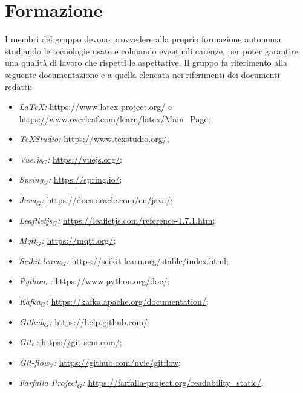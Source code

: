 \section{Formazione}\label{ProcessiOrganizzativiFormazione}
I membri del gruppo devono provvedere alla propria formazione autonoma studiando le tecnologie usate e colmando eventuali carenze, per poter garantire una qualità di lavoro che rispetti le aspettative. Il gruppo fa riferimento alla seguente documentazione e a quella elencata nei riferimenti dei documenti redatti:
\begin{itemize}
	\item \textit{\LaTeX:} \url{https://www.latex-project.org/} e \url{https://www.overleaf.com/learn/latex/Main_Page};
	\item \textit{\TeX Studio:} \url{https://www.texstudio.org/};
	\item \textit{Vue.js$_G$:} \url{https://vuejs.org/};
	\item \textit{Spring$_G$:} \url{https://spring.io/};
	\item \textit{Java$_G$:} \url{https://docs.oracle.com/en/java/};
	\item \textit{Leaftletjs$_G$:} \url{https://leafletjs.com/reference-1.7.1.htm};
	\item \textit{Mqtt$_G$:} \url{https://mqtt.org/};
	\item \textit{Scikit-learn$_G$:} \url{https://scikit-learn.org/stable/index.html};
	\item \textit{Python$_{\scaleto{G}{3pt}}$:} \url{https://www.python.org/doc/};
	\item \textit{Kafka$_G$:} \url{https://kafka.apache.org/documentation/};
	\item \textit{Github$_G$:} \url{https://help.github.com/};
	\item \textit{Git$_{\scaleto{G}{3pt}}$:} \url{https://git-scm.com/};
	\item \textit{Git-flow$_{\scaleto{G}{3pt}}$:} \url{https://github.com/nvie/gitflow};
	\item \textit{Farfalla Project$_G$:} \url{https://farfalla-project.org/readability_static/}.
\end{itemize}